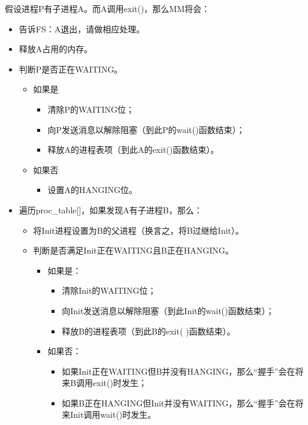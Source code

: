 \documentclass{whureport}
\begin{document}
假设进程P有子进程A。而A调用exit()，那么MM将会：
\begin{itemize}
  \item 告诉FS：A退出，请做相应处理。
  \item 释放A占用的内存。
  \item 判断P是否正在WAITING。
  \begin{itemize}
  \item 如果是
  \begin{itemize}
  \item 清除P的WAITING位；
  \item 向P发送消息以解除阻塞（到此P的wait()函数结束）；
  \item 释放A的进程表项（到此A的exit()函数结束）。
\end{itemize}

  \item 如果否
  \begin{itemize}
  \item 设置A的HANGING位。
\end{itemize}

\end{itemize}
\item 遍历proc\_table[]，如果发现A有子进程B，那么：
\begin{itemize}
  \item 将Init进程设置为B的父进程（换言之，将B过继给Init）。
  \item 判断是否满足Init正在WAITING且B正在HANGING。
  \begin{itemize}
  \item 如果是：
  \begin{itemize}
  \item 清除Init的WAITING位；
  \item 向Init发送消息以解除阻塞（到此Init的wait()函数结束）；
  \item 释放B的进程表项（到此B的exit( )函数结束）。
\end{itemize}

  \item 如果否：
  \begin{itemize}
  \item 如果Init正在WAITING但B并没有HANGING，那么“握手”会在将来B调用exit()时发生；
  \item 如果B正在HANGING但Init并没有WAITING，那么“握手”会在将来Init调用wait()时发生。
\end{itemize}

\end{itemize}

\end{itemize}

\end{itemize}
\end{document}
